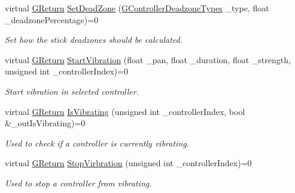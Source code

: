 \begin{DoxyCompactItemize}
\mbox{\label{classGW_1_1SYSTEM_1_1GController_a5ef56fa1c46f57feebf45e8c1cb3055d}} 
virtual \mbox{\hyperlink{namespaceGW_a67a839e3df7ea8a5c5686613a7a3de21}{G\+Return}} \mbox{\hyperlink{classGW_1_1SYSTEM_1_1GController_a5ef56fa1c46f57feebf45e8c1cb3055d}{Set\+Dead\+Zone}} (\mbox{\hyperlink{namespaceGW_1_1SYSTEM_a31011e5fdef70ea7c975794fe99319d4}{G\+Controller\+Deadzone\+Types}} \+\_\+type, float \+\_\+deadzone\+Percentage)=0
\begin{DoxyCompactList}\small\item\em Set how the stick deadzones should be calculated. \end{DoxyCompactList}\item 
\mbox{\label{classGW_1_1SYSTEM_1_1GController_a4d33790f8116be094858618617c65b01}} 
virtual \mbox{\hyperlink{namespaceGW_a67a839e3df7ea8a5c5686613a7a3de21}{G\+Return}} \mbox{\hyperlink{classGW_1_1SYSTEM_1_1GController_a4d33790f8116be094858618617c65b01}{Start\+Vibration}} (float \+\_\+pan, float \+\_\+duration, float \+\_\+strength, unsigned int \+\_\+controller\+Index)=0
\begin{DoxyCompactList}\small\item\em Start vibration in selected controller. \end{DoxyCompactList}\item 
\mbox{\label{classGW_1_1SYSTEM_1_1GController_aee5451a8bed11fa01f9a51e5506719e8}} 
virtual \mbox{\hyperlink{namespaceGW_a67a839e3df7ea8a5c5686613a7a3de21}{G\+Return}} \mbox{\hyperlink{classGW_1_1SYSTEM_1_1GController_aee5451a8bed11fa01f9a51e5506719e8}{Is\+Vibrating}} (unsigned int \+\_\+controller\+Index, bool \&\+\_\+out\+Is\+Vibrating)=0
\begin{DoxyCompactList}\small\item\em Used to check if a controller is currently vibrating. \end{DoxyCompactList}\item 
\mbox{\label{classGW_1_1SYSTEM_1_1GController_a2d1451549619519089a31ab6a075cb09}} 
virtual \mbox{\hyperlink{namespaceGW_a67a839e3df7ea8a5c5686613a7a3de21}{G\+Return}} \mbox{\hyperlink{classGW_1_1SYSTEM_1_1GController_a2d1451549619519089a31ab6a075cb09}{Stop\+Virbration}} (unsigned int \+\_\+controller\+Index)=0
\begin{DoxyCompactList}\small\item\em Used to stop a controller from vibrating. \end{DoxyCompactList}\item 

\end{DoxyCompactItemize}
